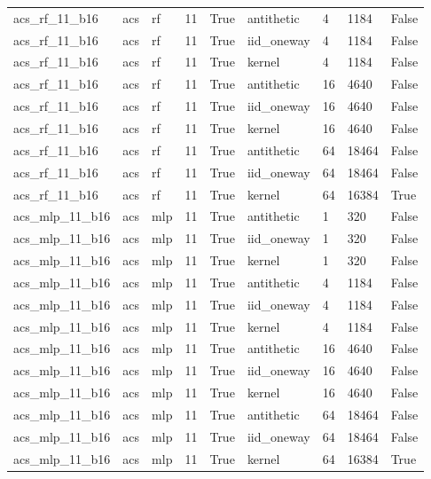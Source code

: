 \begin{tabular}{lllllllll}
acs\_rf\_11\_b16 & acs & rf & 11 & True & antithetic & 4 & 1184 & False \\
acs\_rf\_11\_b16 & acs & rf & 11 & True & iid\_oneway & 4 & 1184 & False \\
acs\_rf\_11\_b16 & acs & rf & 11 & True & kernel & 4 & 1184 & False \\
acs\_rf\_11\_b16 & acs & rf & 11 & True & antithetic & 16 & 4640 & False \\
acs\_rf\_11\_b16 & acs & rf & 11 & True & iid\_oneway & 16 & 4640 & False \\
acs\_rf\_11\_b16 & acs & rf & 11 & True & kernel & 16 & 4640 & False \\
acs\_rf\_11\_b16 & acs & rf & 11 & True & antithetic & 64 & 18464 & False \\
acs\_rf\_11\_b16 & acs & rf & 11 & True & iid\_oneway & 64 & 18464 & False \\
acs\_rf\_11\_b16 & acs & rf & 11 & True & kernel & 64 & 16384 & True \\
acs\_mlp\_11\_b16 & acs & mlp & 11 & True & antithetic & 1 & 320 & False \\
acs\_mlp\_11\_b16 & acs & mlp & 11 & True & iid\_oneway & 1 & 320 & False \\
acs\_mlp\_11\_b16 & acs & mlp & 11 & True & kernel & 1 & 320 & False \\
acs\_mlp\_11\_b16 & acs & mlp & 11 & True & antithetic & 4 & 1184 & False \\
acs\_mlp\_11\_b16 & acs & mlp & 11 & True & iid\_oneway & 4 & 1184 & False \\
acs\_mlp\_11\_b16 & acs & mlp & 11 & True & kernel & 4 & 1184 & False \\
acs\_mlp\_11\_b16 & acs & mlp & 11 & True & antithetic & 16 & 4640 & False \\
acs\_mlp\_11\_b16 & acs & mlp & 11 & True & iid\_oneway & 16 & 4640 & False \\
acs\_mlp\_11\_b16 & acs & mlp & 11 & True & kernel & 16 & 4640 & False \\
acs\_mlp\_11\_b16 & acs & mlp & 11 & True & antithetic & 64 & 18464 & False \\
acs\_mlp\_11\_b16 & acs & mlp & 11 & True & iid\_oneway & 64 & 18464 & False \\
acs\_mlp\_11\_b16 & acs & mlp & 11 & True & kernel & 64 & 16384 & True \\
\bottomrule
\end{tabular}
